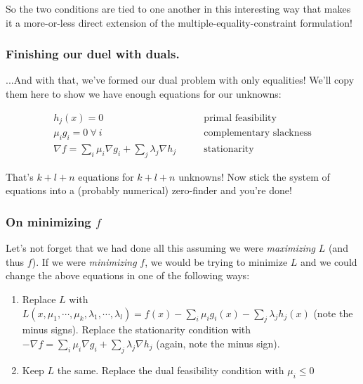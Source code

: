 \documentclass[letterpaper,12pt]{report}
\providecommand{\tightlist}{%
  \setlength{\itemsep}{0pt}\setlength{\parskip}{0pt}}
\begin{document}
So the two conditions are tied to one another in this interesting way
that makes it a more-or-less direct extension of the
multiple-equality-constraint formulation!

\subsubsection{Finishing our duel with
duals.}\label{finishing-our-duel-with-duals.}

...And with that, we've formed our dual problem with only equalities!
We'll copy them here to show we have enough equations for our unknowns:

\[\begin{split} h_j(x) = 0 \qquad            & \text{primal feasibility} \\
\mu_i g_i = 0 \ \forall \ i \qquad           &\text{complementary slackness} \\
\nabla f = \sum _i \mu _i \nabla g_i + \sum _j \lambda _j \nabla h_j \qquad & \text{stationarity}\end{split}\]

That's \(k + l + n\) equations for \(k + l + n\) unknowns! Now stick the
system of equations into a (probably numerical) zero-finder and you're
done!

\subsubsection{\texorpdfstring{On minimizing
\(f\)}{On minimizing f}}\label{on-minimizing-f}

Let's not forget that we had done all this assuming we were
\emph{maximizing} \(L\) (and thus \(f\)). If we were \emph{minimizing}
\(f\), we would be trying to minimize \(L\) and we could change the
above equations in one of the following ways:

\begin{enumerate}
\def\labelenumi{\arabic{enumi}.}
\tightlist
\item
  Replace \(L\) with
  \(L(x,\mu_1, \cdots, \mu_k, \lambda_1, \cdots, \lambda_l) = f(x) - \sum_i \mu_i g_i(x) - \sum_j \lambda_j h_j(x)\)
  (note the minus signs). Replace the stationarity condition with
  \(-\nabla f = \sum _i \mu _i \nabla g_i + \sum _j \lambda _j \nabla h_j\)
  (again, note the minus sign).
\item
  Keep \(L\) the same. Replace the dual feasibility condition with \(
  \mu_i \leq 0 \)
\end{enumerate}
\end{document}
